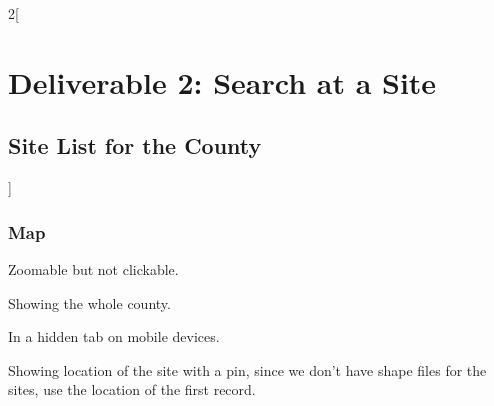 \documentclass[a4paper,12pt,landscape]{article}
\begin{document}
\begin{multicols*}{2}[%
  \section{Deliverable 2: Search at a Site}%
  \subsection{Site List for the County}%
]
\subsubsection*{Map}

\begin{todolist}
  \item Zoomable but not clickable.
  \item Showing the whole county.
  \item In a hidden tab on mobile devices.
  \item Showing location of the site with a pin, since we don't have shape files for the sites,
   use the location of the first record.
\end{todolist}

\clearpage
\end{multicols*}
\end{document}
